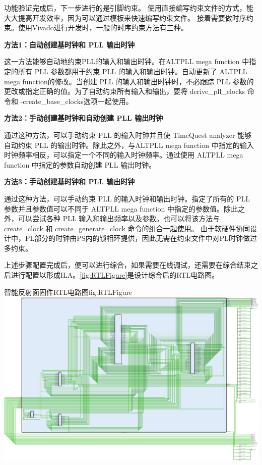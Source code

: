 \documentclass[supercite]{HustGraduPaper}
\begin{document}
功能验证完成后，下一步进行的是引脚约束。
使用直接编写约束文件的方式，能大大提高开发效率，因为可以通过模板来快速编写约束文件。
接着需要做时序约束。使用Vivado进行开发时，一般的时序约束方法有三种。

{\bfseries 方法1：自动创建基时钟和 PLL 输出时钟}

这一方法能够自动地约束PLL的输入和输出时钟。在ALTPLL mega function 中指定的所有 PLL 参数都用于约束 PLL 的输入和输出时钟。自动更新了 ALTPLL mega function的修改。当创建 PLL 的输入和输出时钟时，不必跟踪 PLL 参数的更改或指定正确的值。为了自动约束所有输入和输出，要将 derive\_pll\_clocks 命令和 -create\_base\_clocks选项一起使用。

{\bfseries 方法2：手动创建基时钟和自动创建 PLL 输出时钟}

通过这种方法，可以手动约束 PLL 的输入时钟并且使 TimeQuest analyzer 能够自动约束 PLL 的输出时钟。除此之外，与ALTPLL mega function 中指定的输入时钟频率相反，可以指定一个不同的输入时钟频率。通过使用 ALTPLL mega function 中指定的参数自动创建 PLL 输出时钟。

{\bfseries 方法3：手动创建基时钟和 PLL 输出时钟}

通过这种方法，可以手动约束 PLL 的输入时钟和输出时钟。指定了所有的 PLL 参数并且参数值可以不同于 ALTPLL mega function 中指定的参数值。除此之外，可以尝试各种 PLL 输入和输出频率以及参数。也可以将该方法与 create\_clock 和 create\_generate\_clock 命令的组合一起使用。
由于软硬件协同设计中，PL部分的时钟由PS内的锁相环提供，因此无需在约束文件中对PL时钟做过多约束。

上述步骤配置完成后，便可以进行综合，如果需要在线调试，还需要在综合结束之后进行配置以形成ILA。\autoref{fig:RTLFigure}是设计综合后的RTL电路图。

\begin{generalfig}[htb]{智能反射面固件RTL电路图}{fig:RTLFigure}
	\includegraphics[width=\linewidth]{Figures/RTLFigure.pdf}
\end{generalfig}
\end{document}
